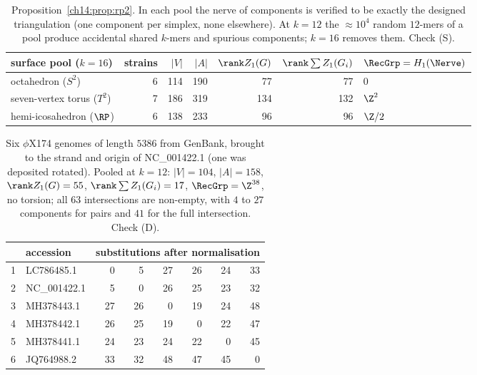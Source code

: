 \begin{table}[t]
\centering
\small
\begin{tabular}{lrrrrrl}
\toprule
surface pool ($k=16$) & strains & $|V|$ & $|A|$ & $\rank Z_1(G)$ & $\rank\sum Z_1(G_i)$ & $\RecGrp=H_1(\Nerve)$\\
\midrule
octahedron ($S^2$)               & 6 & 114 & 190 &  77 &  77 & $0$\\
seven-vertex torus ($T^2$)       & 7 & 186 & 319 & 134 & 132 & $\Z^2$\\
hemi-icosahedron ($\RP$)         & 6 & 138 & 233 &  96 &  96 & $\Z/2$\\
\bottomrule
\end{tabular}
\caption{Proposition~\ref{ch14:prop:rp2}. In each pool the nerve of components is verified to be
exactly the designed triangulation (one component per simplex, none elsewhere). At $k=12$
the $\approx10^4$ random $12$-mers of a pool produce accidental shared $k$-mers and spurious
components; $k=16$ removes them. Check (S).}
\label{ch14:tab:surfaces}
\end{table}

\begin{table}[t]
\centering
\small
\begin{tabular}{llrrrrrr}
\toprule
 & accession & \multicolumn{6}{c}{substitutions after normalisation}\\
\midrule
1 & LC786485.1 & 0 & 5 & 27 & 26 & 24 & 33\\
2 & NC\_001422.1 & 5 & 0 & 26 & 25 & 23 & 32\\
3 & MH378443.1 & 27 & 26 & 0 & 19 & 24 & 48\\
4 & MH378442.1 & 26 & 25 & 19 & 0 & 22 & 47\\
5 & MH378441.1 & 24 & 23 & 24 & 22 & 0 & 45\\
6 & JQ764988.2 & 33 & 32 & 48 & 47 & 45 & 0\\
\bottomrule
\end{tabular}
\caption{Six $\phi$X174 genomes of length $5386$ from GenBank, brought to the strand and
origin of NC\_001422.1 (one was deposited rotated). Pooled at $k=12$: $|V|=104$, $|A|=158$,
$\rank Z_1(G)=55$, $\rank\sum Z_1(G_i)=17$, $\RecGrp=\Z^{38}$, no torsion; all $63$
intersections are non-empty, with $4$ to $27$ components for pairs and $41$ for the full
intersection. Check (D).}
\label{ch14:tab:iso}
\end{table}

